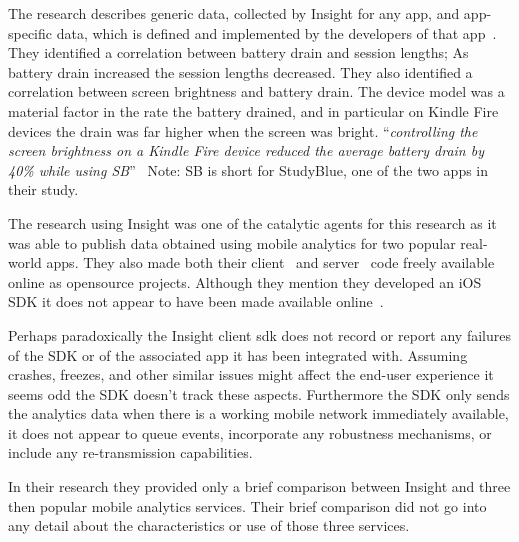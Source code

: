 The research describes generic data, collected by Insight for any app, and app-specific data, which is defined and implemented by the developers of that app~. They identified a correlation between battery drain and session lengths; As battery drain increased the session lengths decreased. They also identified a correlation between screen brightness and battery drain. The device model was a material factor in the rate the battery drained, and in particular on Kindle Fire devices the drain was far higher when the screen was bright. ``\emph{controlling the screen brightness on a Kindle Fire device reduced the average battery drain by 40\% while using SB}''~ Note: SB is short for StudyBlue, one of the two apps in their study.

The research using Insight was one of the catalytic agents for this research as it was able to publish data obtained using mobile analytics for two popular real-world apps. 
They also made both their client~ and server~ code freely available online as opensource projects. 
Although they mention they developed an iOS SDK it does not appear to have been made available online~.

Perhaps paradoxically the Insight client \Gls{sdk} does not record or report any failures of the SDK or of the associated app it has been integrated with. Assuming crashes, freezes, and other similar issues might affect the end-user experience it seems odd the SDK doesn't track these aspects. Furthermore the SDK only sends the analytics data when there is a working mobile network immediately available, it does not appear to queue events, incorporate any robustness mechanisms, or include any re-transmission capabilities.

In their research they provided only a brief comparison between Insight and three then popular mobile analytics services. Their brief comparison did not go into any detail about the characteristics or use of those three services.


